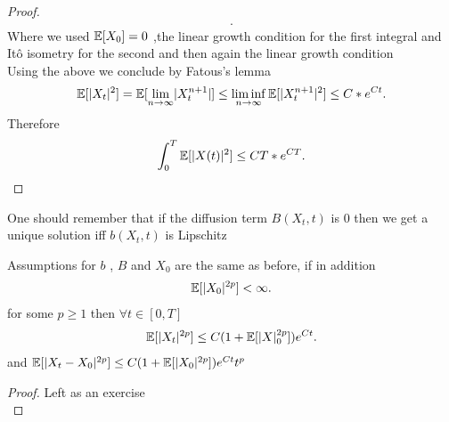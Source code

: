 \begin{proof}
\begin{align*}
   .\end{align*}
   Where we used $\mathbb{E}[X_{0}] = 0$ ,the  linear growth condition for the first integral and It\^o isometry for the second and then again the linear growth condition\\[1ex]
    Using the above we conclude by Fatous's lemma
    \begin{align*}
      \E[\abs{X_t}^2] = \E[\lim_{n\to \infty} \abs{X^{n+1}_t }]  \le  \liminf_{n\to \infty} \E[\abs{X^{n+1}_t }^2] \le C*e^{Ct} 
    .\end{align*}
    Therefore 
    \begin{align*}
      \int_0^{T} \mathbb{E}[\lvert X(t)\rvert^2]  \le  CT*e^{CT} 
    .\end{align*}
\end{proof}
\begin{remark}
  One should remember that if the diffusion term $B(X_t,t)$ is 0 then we get a unique solution iff $b(X_t,t)$ is Lipschitz
\end{remark}
\begin{theorem}
  Assumptions for $b$ , $B$ and $X_{0}$ are the same as before, if in addition 
  \begin{align*}
    \mathbb{E}[\lvert X_0\rvert^{2p} ]< \infty
  .\end{align*}
  for some $p \ge 1$ then $\forall  t \in  [0,T]$ 
  \begin{align*}
    \mathbb{E}[\lvert X_t\rvert^{2p}]\le C(1+\mathbb{E}[\lvert X\rvert_0^{2p} ])e^{Ct} 
  .\end{align*}
  and $\mathbb{E}[\lvert X_t - X_0\rvert^{2p} ] \le  C(1+\mathbb{E}[\lvert X_0\rvert^{2p} ])e^{Ct}t^p $
\end{theorem}
\begin{proof}
 Left as an exercise \\
\end{proof}
\newpage
